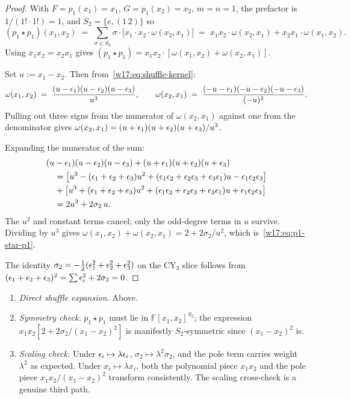 \begin{proof}
With $F = p_1(x_1) = x_1$, $G = p_1(x_2) = x_2$, $m = n = 1$, the
prefactor is $1/(1! \cdot 1!) = 1$, and $S_2 = \{e, (1\,2)\}$ so
\[
 (p_1 \star p_1)(x_1, x_2)
 \;=\; \sum_{\sigma \in S_2} \sigma \cdot
 \bigl[x_1 \cdot x_2 \cdot \omega(x_2, x_1)\bigr]
 \;=\; x_1 x_2 \cdot \omega(x_2, x_1) + x_2 x_1 \cdot \omega(x_1, x_2).
\]
Using $x_1 x_2 = x_2 x_1$ gives
$(p_1 \star p_1) = x_1 x_2 \cdot [\omega(x_1, x_2) + \omega(x_2, x_1)]$.

Set $u := x_1 - x_2$. Then from~\eqref{w17:eq:shuffle-kernel}:
\[
 \omega(x_1, x_2) \;=\; \frac{(u - \epsilon_1)(u - \epsilon_2)(u - \epsilon_3)}{u^3},
 \qquad
 \omega(x_2, x_1) \;=\; \frac{(-u - \epsilon_1)(-u - \epsilon_2)(-u - \epsilon_3)}{(-u)^3}.
\]
Pulling out three signs from the numerator of $\omega(x_2, x_1)$ against one
from the denominator gives
$\omega(x_2, x_1) = (u + \epsilon_1)(u + \epsilon_2)(u + \epsilon_3)/u^3$.

Expanding the numerator of the sum:
\begin{align*}
 &(u - \epsilon_1)(u - \epsilon_2)(u - \epsilon_3) + (u + \epsilon_1)(u + \epsilon_2)(u + \epsilon_3) \\
 &\quad = \bigl[u^3 - (\epsilon_1 + \epsilon_2 + \epsilon_3) u^2
 + (\epsilon_1\epsilon_2 + \epsilon_2\epsilon_3 + \epsilon_3\epsilon_1) u - \epsilon_1\epsilon_2\epsilon_3\bigr] \\
 &\quad + \bigl[u^3 + (\epsilon_1 + \epsilon_2 + \epsilon_3) u^2
 + (\epsilon_1\epsilon_2 + \epsilon_2\epsilon_3 + \epsilon_3\epsilon_1) u + \epsilon_1\epsilon_2\epsilon_3\bigr] \\
 &\quad = 2 u^3 + 2 \sigma_2\, u.
\end{align*}
The $u^2$ and constant terms cancel; only the odd-degree terms in $u$ survive.
Dividing by $u^3$ gives $\omega(x_1, x_2) + \omega(x_2, x_1) = 2 + 2\sigma_2/u^2$,
which is~\eqref{w17:eq:p1-star-p1}.

The identity $\sigma_2 = -\tfrac{1}{2}(\epsilon_1^2 + \epsilon_2^2 + \epsilon_3^2)$ on the
CY$_3$ slice follows from
$(\epsilon_1 + \epsilon_2 + \epsilon_3)^2 = \sum \epsilon_i^2 + 2 \sigma_2 = 0$.
\end{proof}

\begin{verification}
\label{w17:verif:p1-star-p1}\mbox{}
\begin{enumerate}
\item \emph{Direct shuffle expansion.} Above.
\item \emph{Symmetry check.} $p_1 \star p_1$ must lie in
$\mathbb{F}[x_1, x_2]^{S_2}$; the expression $x_1 x_2 [2 + 2\sigma_2/(x_1 - x_2)^2]$
is manifestly $S_2$-symmetric since $(x_1 - x_2)^2$ is.
\item \emph{Scaling check.} Under $\epsilon_i \mapsto \lambda \epsilon_i$,
$\sigma_2 \mapsto \lambda^2 \sigma_2$, and the pole term carries weight $\lambda^2$
as expected. Under $x_i \mapsto \lambda x_i$, both the polynomial piece
$x_1 x_2$ and the pole piece $x_1 x_2/(x_1 - x_2)^2$ transform consistently.
The scaling cross-check is a genuine third path.
\end{enumerate}
\end{verification}

